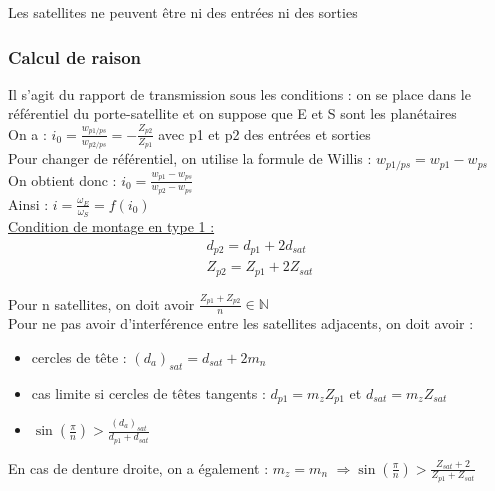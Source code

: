 \documentclass[../main.tex]{subfiles}
\begin{document}
\warning Les satellites ne peuvent être ni des entrées ni des sorties\\

\subsubsection{Calcul de raison}
Il s'agit du rapport de transmission sous les conditions : on se place dans le référentiel du porte-satellite et on suppose que E et S sont les planétaires\\

On a : $i_0 = \frac{w_{p1/ps}}{w_{p2/ps}} = -\frac{Z_{p2}}{Z_{p1}}$ avec p1 et p2 des entrées et sorties\\

Pour changer de référentiel, on utilise la formule de Willis : $w_{p1/ps} = w_{p1}-w_{ps}$\\
On obtient donc : $i_0 = \frac{w_{p1}-w_{ps}}{w_{p2}-w_{ps}}$\\

Ainsi : $i = \frac{\omega_E}{\omega_S} = f(i_0)$\\

\quad \underline{Condition de montage en type 1 :}\\
\begin{equation}
    \begin{gathered}
        d_{p2} = d_{p1}+2 d_{sat}\\
        Z_{p2} = Z_{p1} + 2 Z_{sat}
    \end{gathered}
\end{equation}

Pour n satellites, on doit avoir $\frac{Z_{p1}+Z_{p2}}{n} \in \mathbb{N}$\\

Pour ne pas avoir d'interférence entre les satellites adjacents, on doit avoir : \begin{itemize}
    \item cercles de tête : $(d_a)_{sat} = d_{sat} + 2m_n$\\
    \item cas limite si cercles de têtes tangents : $d_{p1} = m_z Z_{p1}$ et $d_{sat} = m_z Z_{sat}$\\
    \item $\sin(\frac{\pi}{n}) > \frac{(d_a)_{sat}}{d_{p1}+d_{sat}}$\\
\end{itemize}

En cas de denture droite, on a également : $m_z = m_n$ $\Rightarrow \sin(\frac{\pi}{n})> \frac{Z_{sat}+2}{Z_{p1}+Z_{sat}}$\\
\end{document}
